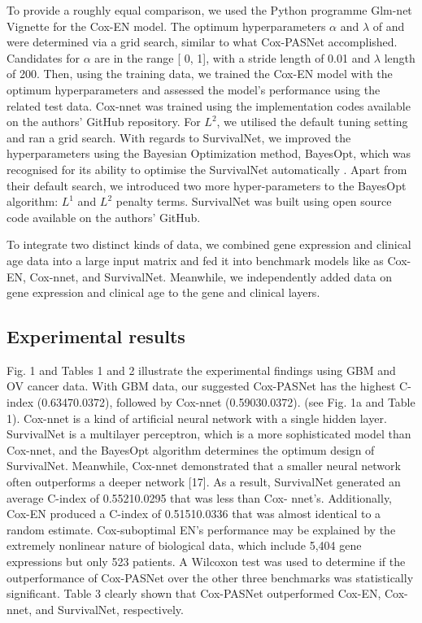 \documentclass[10pt,twocolumn,twoside,lineno]{gsajnl}
\begin{document}
To provide a roughly equal comparison, we used the Python programme Glm-net Vignette \citep{JSSv039i05} for the Cox-EN model. The optimum hyperparameters $ \alpha $ and $ \lambda $ of and were determined via a grid search, similar to what Cox-PASNet accomplished. Candidates for $ \alpha $ are in the range [ 0, 1], with a stride length of 0.01 and $ \lambda $ length of 200. Then, using the training data, we trained the Cox-EN model with the optimum hyperparameters and assessed the model's performance using the related test data. Cox-nnet was trained using the implementation codes available on the authors' GitHub repository. For $ L^{2} $, we utilised the default tuning setting and ran a grid search. With regards to SurvivalNet, we improved the hyperparameters using the Bayesian Optimization method, BayesOpt, which was recognised for its ability to optimise the SurvivalNet automatically \citep{DBLP:journals/corr/Martinez-Cantin14}. Apart from their default search, we introduced two more hyper-parameters to the BayesOpt algorithm: $ L^{1} $ and $ L^{2} $ penalty terms. SurvivalNet was built using open source code available on the authors' GitHub.


To integrate two distinct kinds of data, we combined gene expression and clinical age data into a large input matrix and fed it into benchmark models like as Cox-EN, Cox-nnet, and SurvivalNet. Meanwhile, we independently added data on gene expression and clinical age to the gene and clinical layers.



\subsection{Experimental results}

Fig. 1 and Tables 1 and 2 illustrate the experimental findings using GBM and OV cancer data. With GBM data, our suggested Cox-PASNet has the highest C-index (0.63470.0372), followed by Cox-nnet (0.59030.0372). (see Fig. 1a and Table 1). Cox-nnet is a kind of artificial neural network with a single hidden layer. SurvivalNet is a multilayer perceptron, which is a more sophisticated model than Cox-nnet, and the BayesOpt algorithm determines the optimum design of SurvivalNet. Meanwhile, Cox-nnet demonstrated that a smaller neural network often outperforms a deeper network [17]. As a result, SurvivalNet generated an average C-index of 0.55210.0295 that was less than Cox- nnet's. Additionally, Cox-EN produced a C-index of 0.51510.0336 that was almost identical to a random estimate. Cox-suboptimal EN's performance may be explained by the extremely nonlinear nature of biological data, which include 5,404 gene expressions but only 523 patients. A Wilcoxon test was used to determine if the outperformance of Cox-PASNet over the other three benchmarks was statistically significant. Table 3 clearly shown that Cox-PASNet outperformed Cox-EN, Cox-nnet, and SurvivalNet, respectively.
\end{document}
